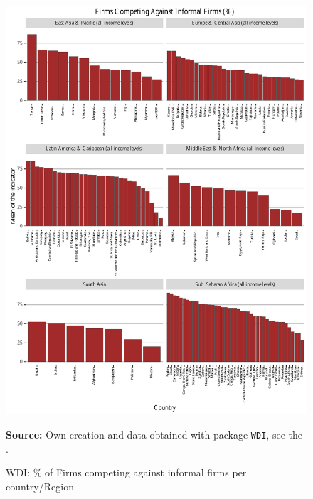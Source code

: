 \begin{figure}[H]
\begin{center}
\caption{WDI: \% of Firms competing against informal firms per country/Region}
\label{fig_wdi_firms}
\includegraphics[max height=.9\textheight]{../img/wdi_firms_competing_against_informal_firms_perc.pdf}
\end{center}
\noindent \footnotesize{\textbf{Source:} Own creation and data obtained with package \texttt{WDI}, see the \cite{wb_r}.}
\end{figure}

